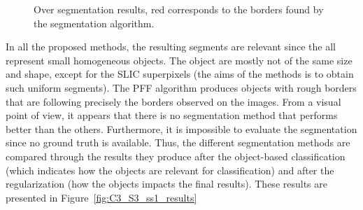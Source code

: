 \begin{figure}[htbp]
\begin{center}
\endgroup
\caption{Over segmentation results, red corresponds to the borders found by the segmentation algorithm.}
\label{fig:C3_S3_ss1_seg}
\end{center}
\end{figure}

In all the proposed methods, the resulting segments are relevant since the all represent small homogeneous objects. The object are mostly not of the same size and shape, except for the SLIC superpixels (the aims of the methods is to obtain such uniform segments). The PFF algorithm produces objects with rough borders that are following precisely the borders observed on the images. From a visual point of view, it appears that there is no segmentation method that performs better than the others. Furthermore, it is impossible to evaluate the segmentation since no ground truth is available. Thus, the different segmentation methods are compared through the results they produce after the object-based classification (which indicates how the objects are relevant for classification) and after the regularization (how the objects impacts the final results). These results are presented in Figure~\ref{fig:C3_S3_ss1_results}\\

